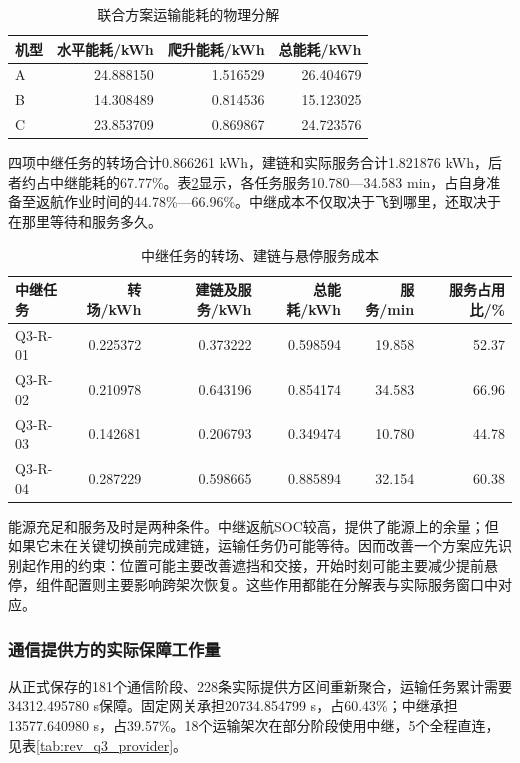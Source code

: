 \documentclass[withoutpreface,colorprint]{format}
\numberwithin{equation}{section}
\numberwithin{figure}{section}
\numberwithin{table}{section}
\begin{document}
\begin{table}[htbp]\centering\small
\caption{联合方案运输能耗的物理分解}\label{tab:rev_q3_transport_energy}
\begin{tabular}{lrrr}\toprule
机型 & 水平能耗/kWh & 爬升能耗/kWh & 总能耗/kWh\\\midrule
A & 24.888150 & 1.516529 & 26.404679\\
B & 14.308489 & 0.814536 & 15.123025\\
C & 23.853709 & 0.869867 & 24.723576\\
\bottomrule\end{tabular}
\end{table}


四项中继任务的转场合计0.866261 kWh，建链和实际服务合计1.821876 kWh，后者约占中继能耗的67.77\%。表\ref{tab:rev_q3_relay_energy}显示，各任务服务10.780—34.583 min，占自身准备至返航作业时间的44.78\%—66.96\%。中继成本不仅取决于飞到哪里，还取决于在那里等待和服务多久。

\begin{table}[htbp]\centering\small
\caption{中继任务的转场、建链与悬停服务成本}\label{tab:rev_q3_relay_energy}
\begin{tabular}{lrrrrr}\toprule
中继任务 & 转场/kWh & 建链及服务/kWh & 总能耗/kWh & 服务/min & 服务占用比/\%\\\midrule
Q3-R-01 & 0.225372 & 0.373222 & 0.598594 & 19.858 & 52.37\\
Q3-R-02 & 0.210978 & 0.643196 & 0.854174 & 34.583 & 66.96\\
Q3-R-03 & 0.142681 & 0.206793 & 0.349474 & 10.780 & 44.78\\
Q3-R-04 & 0.287229 & 0.598665 & 0.885894 & 32.154 & 60.38\\
\bottomrule\end{tabular}
\end{table}


能源充足和服务及时是两种条件。中继返航SOC较高，提供了能源上的余量；但如果它未在关键切换前完成建链，运输任务仍可能等待。因而改善一个方案应先识别起作用的约束：位置可能主要改善遮挡和交接，开始时刻可能主要减少提前悬停，组件配置则主要影响跨架次恢复。这些作用都能在分解表与实际服务窗口中对应。

\subsubsection{通信提供方的实际保障工作量}
从正式保存的181个通信阶段、228条实际提供方区间重新聚合，运输任务累计需要34312.495780 s保障。固定网关承担20734.854799 s，占60.43\%；中继承担13577.640980 s，占39.57\%。18个运输架次在部分阶段使用中继，5个全程直连，见表\ref{tab:rev_q3_provider}。
\end{document}
